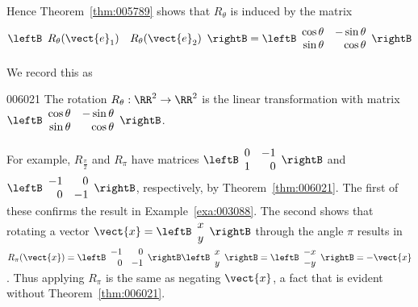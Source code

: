 \noindent Hence Theorem~\ref{thm:005789} shows that $R_{\theta}$ is induced by the matrix
\begin{equation*}
\leftB \begin{array}{cc}
R_{\theta}(\vect{e}_{1}) & R_{\theta}(\vect{e}_{2})
\end{array} \rightB = \leftB \begin{array}{rr}
\cos \theta & -\sin \theta \\
\sin \theta & \cos \theta
\end{array} \rightB
\end{equation*}

We record this as

\begin{theorem}{}{006021}
The rotation $R_{\theta} : \RR^2 \to \RR^2$ is the linear transformation with matrix $\leftB \begin{array}{rr}
	\cos \theta & -\sin \theta \\
	\sin \theta & \cos \theta
\end{array} \rightB$.
\end{theorem}

For example, $R_{\frac{\pi}{2}}$
 and $R_{\pi}$ have matrices $\leftB \begin{array}{rr}
 0 & -1 \\
 1 & 0
 \end{array} \rightB$
 and $\leftB \begin{array}{rr}
 -1 & 0 \\
 0 & -1
 \end{array} \rightB$, respectively, by Theorem~\ref{thm:006021}. The first of these confirms the result in Example~\ref{exa:003088}. The second shows that rotating a vector $\vect{x} = \leftB \begin{array}{c}
 x \\
 y
 \end{array} \rightB$
 through the angle $\pi$ results in $R_{\pi}(\vect{x}) = \leftB \begin{array}{rr}
 -1 & 0 \\
 0 & -1
 \end{array} \rightB \leftB \begin{array}{c}
 x \\
 y
 \end{array} \rightB = \leftB \begin{array}{c}
 -x \\
 -y
 \end{array} \rightB = -\vect{x}$.
 Thus applying $R_{\pi}$ is the same as negating $\vect{x}$, a fact that is evident without Theorem~\ref{thm:006021}.


